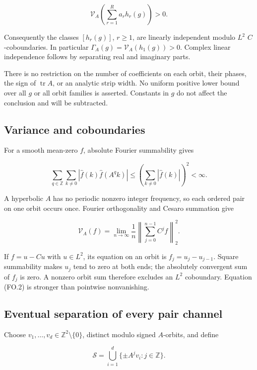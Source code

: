 \[
 \boxed{\mathcal V_A\!\left(\sum_{r=1}^R a_rh_r(g)\right)>0.}
\tag{FO.2}
\]

Consequently the classes \([h_r(g)]\), \(r\ge1\), are linearly independent modulo \(L^2\) \(C\)-coboundaries. In particular \(\Gamma_A(g)=\mathcal V_A(h_1(g))>0\). Complex linear independence follows by separating real and imaginary parts.

There is no restriction on the number of coefficients on each orbit, their phases, the sign of \(\operatorname{tr}A\), or an analytic strip width. No uniform positive lower bound over all \(g\) or all orbit families is asserted. Constants in \(g\) do not affect the conclusion and will be subtracted.

\hypertarget{variance-and-coboundaries}{%
\subsection{Variance and coboundaries}\label{variance-and-coboundaries}}

For a smooth mean-zero \(f\), absolute Fourier summability gives

\[
 \sum_{q\in\mathbb Z}\sum_{k\ne0}
 |\widehat f(k)\widehat f(A^qk)|
 \le \left(\sum_{k\ne0}|\widehat f(k)|\right)^2<\infty.
\]

A hyperbolic \(A\) has no periodic nonzero integer frequency, so each ordered pair on one orbit occurs once. Fourier orthogonality and Cesaro summation give

\[
 \mathcal V_A(f)=\lim_{n\to\infty}\frac1n
       \left\|\sum_{j=0}^{n-1}C^jf\right\|_2^2.
\tag{FO.3}
\]

If \(f=u-Cu\) with \(u\in L^2\), its equation on an orbit is \(f_j=u_j-u_{j-1}\). Square summability makes \(u_j\) tend to zero at both ends; the absolutely convergent sum of \(f_j\) is zero. A nonzero orbit sum therefore excludes an \(L^2\) coboundary. Equation (FO.2) is stronger than pointwise nonvanishing.

\hypertarget{eventual-separation-of-every-pair-channel}{%
\subsection{Eventual separation of every pair channel}\label{eventual-separation-of-every-pair-channel}}

Choose \(v_1,\ldots,v_d\in\mathbb Z^2\setminus\{0\}\), distinct modulo signed \(A\)-orbits, and define

\[
 \mathcal S=\bigcup_{i=1}^d\{\pm A^jv_i:j\in\mathbb Z\}.
\]

